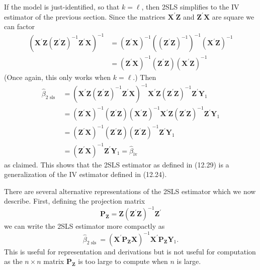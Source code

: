 \documentclass[10pt]{article}
\begin{document}
If the model is just-identified, so that $k=\ell$, then 2SLS simplifies to the IV estimator of the previous section. Since the matrices $\boldsymbol{X}^{\prime} \boldsymbol{Z}$ and $\boldsymbol{Z}^{\prime} \boldsymbol{X}$ are square we can factor
$$
\begin{aligned}
\left(\boldsymbol{X}^{\prime} \boldsymbol{Z}\left(\boldsymbol{Z}^{\prime} \boldsymbol{Z}\right)^{-1} \boldsymbol{Z}^{\prime} \boldsymbol{X}\right)^{-1} &=\left(\boldsymbol{Z}^{\prime} \boldsymbol{X}\right)^{-1}\left(\left(\boldsymbol{Z}^{\prime} \boldsymbol{Z}\right)^{-1}\right)^{-1}\left(\boldsymbol{X}^{\prime} \boldsymbol{Z}\right)^{-1} \\
&=\left(\boldsymbol{Z}^{\prime} \boldsymbol{X}\right)^{-1}\left(\boldsymbol{Z}^{\prime} \boldsymbol{Z}\right)\left(\boldsymbol{X}^{\prime} \boldsymbol{Z}\right)^{-1}
\end{aligned}
$$
(Once again, this only works when $k=\ell$.) Then
$$
\begin{aligned}
\widehat{\beta}_{2 \text { sls }} &=\left(\boldsymbol{X}^{\prime} \boldsymbol{Z}\left(\boldsymbol{Z}^{\prime} \boldsymbol{Z}\right)^{-1} \boldsymbol{Z}^{\prime} \boldsymbol{X}\right)^{-1} \boldsymbol{X}^{\prime} \boldsymbol{Z}\left(\boldsymbol{Z}^{\prime} \boldsymbol{Z}\right)^{-1} \boldsymbol{Z}^{\prime} \boldsymbol{Y}_{1} \\
&=\left(\boldsymbol{Z}^{\prime} \boldsymbol{X}\right)^{-1}\left(\boldsymbol{Z}^{\prime} \boldsymbol{Z}\right)\left(\boldsymbol{X}^{\prime} \boldsymbol{Z}\right)^{-1} \boldsymbol{X}^{\prime} \boldsymbol{Z}\left(\boldsymbol{Z}^{\prime} \boldsymbol{Z}\right)^{-1} \boldsymbol{Z}^{\prime} \boldsymbol{Y}_{1} \\
&=\left(\boldsymbol{Z}^{\prime} \boldsymbol{X}\right)^{-1}\left(\boldsymbol{Z}^{\prime} \boldsymbol{Z}\right)\left(\boldsymbol{Z}^{\prime} \boldsymbol{Z}\right)^{-1} \boldsymbol{Z}^{\prime} \boldsymbol{Y}_{1} \\
&=\left(\boldsymbol{Z}^{\prime} \boldsymbol{X}\right)^{-1} \boldsymbol{Z}^{\prime} \boldsymbol{Y}_{1}=\widehat{\beta}_{\mathrm{iv}}
\end{aligned}
$$
as claimed. This shows that the 2SLS estimator as defined in (12.29) is a generalization of the IV estimator defined in (12.24).

There are several alternative representations of the 2SLS estimator which we now describe. First, defining the projection matrix
$$
\boldsymbol{P}_{\boldsymbol{Z}}=\boldsymbol{Z}\left(\boldsymbol{Z}^{\prime} \boldsymbol{Z}\right)^{-1} \boldsymbol{Z}^{\prime}
$$
we can write the 2SLS estimator more compactly as
$$
\widehat{\beta}_{2 \text { sls }}=\left(\boldsymbol{X}^{\prime} \boldsymbol{P}_{\boldsymbol{Z}} \boldsymbol{X}\right)^{-1} \boldsymbol{X}^{\prime} \boldsymbol{P}_{\boldsymbol{Z}} \boldsymbol{Y}_{1} .
$$
This is useful for representation and derivations but is not useful for computation as the $n \times n$ matrix $\boldsymbol{P}_{\boldsymbol{Z}}$ is too large to compute when $n$ is large.
\end{document}
